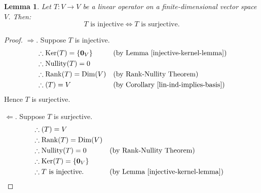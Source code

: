 \documentclass[a4paper,11pt]{book}
\newtheorem{lemma}[theorem]{Lemma}
\theoremstyle{definition}
\newcommand{\ve}[1]{\mathbf{#1}}
\DeclareMathOperator{\Dim}{Dim}
\DeclareMathOperator{\Ker}{Ker}
\DeclareMathOperator{\Nullity}{Nullity}
\DeclareMathOperator{\Rank}{Rank}
\let\Im\relax
\DeclareMathOperator{\Im}{Im} %
\begin{document}
\begin{lemma} \label{inj-surj} Let $T : V \rightarrow V$ be a linear operator on a finite-dimensional vector space $V$. Then:
\[
 \mbox{$T$ is injective} \Longleftrightarrow \mbox{$T$ is surjective}.
\]
\end{lemma}
\begin{proof}
$\Rightarrow$. Suppose $T$ is injective. 
\begin{align*}
  &\therefore \Ker(T) = \{\ve{0}_V\} && \mbox{(by Lemma \ref{injective-kernel-lemma})}  \\
  &\therefore \Nullity(T) = 0 \\
  &\therefore \Rank(T) = \Dim(V) && \mbox{(by Rank-Nullity Theorem)} \\
  &\therefore \Im(T) = V && \mbox{(by Corollary \ref{lin-ind-implies-basis})}
\end{align*}
Hence $T$ is surjective.

$\Leftarrow$. Suppose $T$ is surjective.
\begin{align*}
 &\therefore \Im(T) = V \\
 &\therefore \Rank(T) = \Dim(V) \\
 &\therefore \Nullity(T) = 0 && \mbox{(by Rank-Nullity Theorem)} \\
 &\therefore \Ker(T) = \{\ve{0}_V\} \\
 &\therefore \mbox{$T$ is injective. }  && \mbox{(by Lemma \ref{injective-kernel-lemma})}
\end{align*}
\end{proof}
\end{document}
